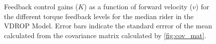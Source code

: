 \begin{figure}
\begin{subfigure}[b]{\textwidth}
        \end{subfigure}
        \begin{subfigure}[b]{\textwidth}
            \centering
            \caption{}            
            \label{fig:gains_speed3}
        \end{subfigure}
        \caption{Feedback control gains (\ensuremath{K}) as a function of forward velocity (\ensuremath{v}) for the different torque feedback levels for the median rider in the VDROP Model. Error bars indicate the standard errror of the mean calculated from the covariance matrix calculated by \cref{fig:cov_mat}.}
        \label{fig:gains_speed}
     \end{figure}




